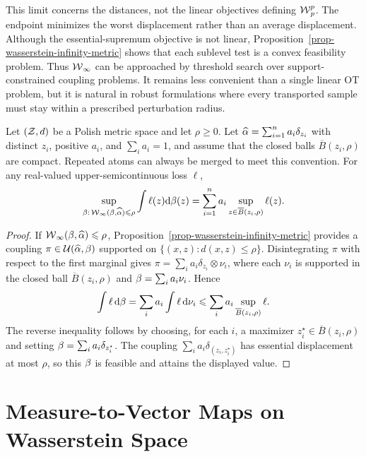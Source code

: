 This limit concerns the distances, not the linear objectives defining $\operatorname{\mathcal{W}}_p^p$. The endpoint minimizes the worst displacement rather than an average displacement. Although the essential-supremum objective is not linear, Proposition~\ref{prop-wasserstein-infinity-metric} shows that each sublevel test is a convex feasibility problem.
Thus $\operatorname{\mathcal{W}}_\infty$ can be approached by threshold search over support-constrained coupling problems. It remains less convenient than a single linear OT problem, but it is natural in robust formulations where every transported sample must stay within a prescribed perturbation radius.

\begin{prop}\label{prop-wasserstein-infty-dro}
		Let $(\mathcal{Z},d)$ be a Polish metric space and let $\rho\geq0$. Let $\widehat{\alpha}=\sum_{i=1}^n a_i\delta_{z_i}$ with distinct $z_i$, positive $a_i$, and $\sum_i a_i=1$, and assume that the closed balls $\overline B(z_i,\rho)$ are compact. Repeated atoms can always be merged to meet this convention. For any real-valued upper-semicontinuous loss $\ell$,
	\[
		\sup_{\beta:\,\operatorname{\mathcal{W}}_\infty(\beta,\widehat{\alpha})\leqslant\rho}
		\int \ell(z)\mathrm{d}\beta(z)
		=
		\sum_{i=1}^n a_i\sup_{z\in\overline B(z_i,\rho)}\ell(z).
	\]
\end{prop}
\begin{proof}
	If $\operatorname{\mathcal{W}}_\infty(\beta,\widehat{\alpha})\leqslant\rho$, Proposition~\ref{prop-wasserstein-infinity-metric} provides a coupling $\pi\in\mathcal{U}(\widehat{\alpha},\beta)$ supported on $\{(x,z):d(x,z)\leq\rho\}$.
	Disintegrating $\pi$ with respect to the first marginal gives $\pi=\sum_i a_i\delta_{z_i}\otimes\nu_i$, where each $\nu_i$ is supported in the closed ball $\overline B(z_i,\rho)$ and $\beta=\sum_i a_i\nu_i$. Hence
	\[
		\int\ell\,\mathrm{d}\beta
		=
		\sum_i a_i\int\ell\,\mathrm{d}\nu_i
		\leqslant
		\sum_i a_i\sup_{\overline B(z_i,\rho)}\ell.
	\]
	The reverse inequality follows by choosing, for each $i$, a maximizer $z_i^\star\in\overline B(z_i,\rho)$ and setting $\beta=\sum_i a_i\delta_{z_i^\star}$. The coupling $\sum_i a_i\delta_{(z_i,z_i^\star)}$ has essential displacement at most $\rho$, so this $\beta$ is feasible and attains the displayed value.
\end{proof}

\section{Measure-to-Vector Maps on Wasserstein Space}\label{sec-measure-to-vector-maps}

